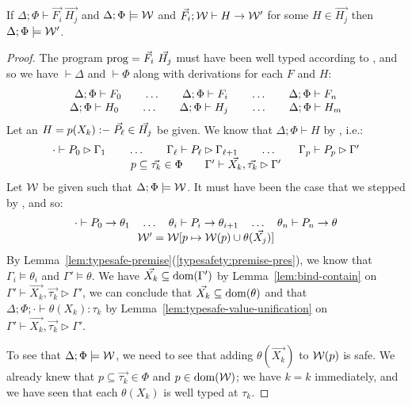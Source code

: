 \documentclass[acmsmall,screen,nonacm]{acmart}
\theoremstyle{definition}
\begin{document}
\begin{theorem}
\label{thm:typesafe-program-pres}
  If $\Delta; \Phi \vdash \vec{F_i} ~ \vec{H_j}$ and $\Delta; \Phi \models \mathcal{W}$ and
%
  $\vec{F_i}; \mathcal{W} \vdash H \rightarrow \mathcal{W}'$ for some $H \in \vec{H_j}$ then
%
  $\Delta; \Phi \models \mathcal{W}'$.
%
\begin{proof}
 The program $\mathrm{prog} = \vec{F_i} ~ \vec{H_j}$ must have been well
  typed according to , and so we have $\vdash \Delta$
  and $\vdash \Phi$ along with derivations for each $F$ and $H$:
%
  \[ \begin{array}{c} 
     \Delta; \Phi \vdash F_0 \quad\quad \dots \quad\quad
     \Delta; \Phi \vdash F_i \quad\quad \dots \quad\quad
     \Delta; \Phi \vdash F_n \\
     \Delta; \Phi \vdash H_0 \quad\quad \dots \quad\quad
     \Delta; \Phi \vdash H_j \quad\quad \dots \quad\quad
     \Delta; \Phi \vdash H_m \\
   \end{array} \]
%
  Let an $H = p(X_k) \mathrel{\mathsf{\mathord{:}\mathord{-}}} \vec{P_\ell} \in \vec{H_j}$ be given.
%
  We know that $\Delta; \Phi \vdash H$ by , i.e.:
%
  \[ \begin{array}{c}
     \cdot \vdash P_0 \rhd \Gamma_1 \quad\quad \dots \quad\quad
     \Gamma_{\ell} \vdash P_{\ell} \rhd \Gamma_{\ell+1} \quad\quad \dots \quad\quad
     \Gamma_p \vdash P_p \rhd \Gamma' \\
     p \subseteq \vec{\tau_k} \in \Phi \quad\quad
     \Gamma' \vdash \vec{X_k}, \vec{\tau_k} \rhd \Gamma'
  \end{array} \]
%
  Let $\mathcal{W}$ be given such that $\Delta; \Phi \models \mathcal{W}$.
%
  It must have been the case that we stepped by , and so:
%
  \[ \begin{array}{c}
     \cdot    \vdash P_{0} \rightarrow \theta_1 \quad \dots \quad
     \theta_i \vdash P_{i} \rightarrow \theta_{i+1} \quad \dots \quad
     \theta_n \vdash P_{n} \rightarrow \theta \\
     \mathcal{W}' = \mathcal{W}[p \mapsto \mathcal{W}(p) \cup \theta(\vec{X_j})] \\
  \end{array} \]
%
  By Lemma~\ref{lem:typesafe-premise}(\ref{typesafety:premise-pres}),
  we know that $\Gamma_i \models \theta_i$ and
  $\Gamma' \models \theta$. We have
  $\vec{X_k} \subseteq \mathrm{dom}(\Gamma')$ by Lemma~\ref{lem:bind-contain}
  on $\Gamma' \vdash \vec{X_k}, \vec{\tau_k} \rhd \Gamma'$, we can
  conclude that $\vec{X_k} \subseteq \mathrm{dom}(\theta)$ and that
  $\Delta; \Phi; \cdot \vdash \theta(X_k) : \tau_k$ by
  Lemma~\ref{lem:typesafe-value-unification} on
  $\Gamma' \vdash \vec{X_k}, \vec{\tau_k} \rhd \Gamma'$.

  To see that $\Delta; \Phi \models \mathcal{W}$, we need to see that
  adding $\theta(\vec{X_k})$ to $\mathcal{W}(p)$ is safe. We already knew
  that $p \subseteq \vec{\tau_k} \in \Phi$ and $p \in \mathrm{dom}(\mathcal{W})$; we
  have $k = k$ immediately, and we have seen that each $\theta(X_k)$
  is well typed at $\tau_k$.
\end{proof}
\end{theorem}
\end{document}
